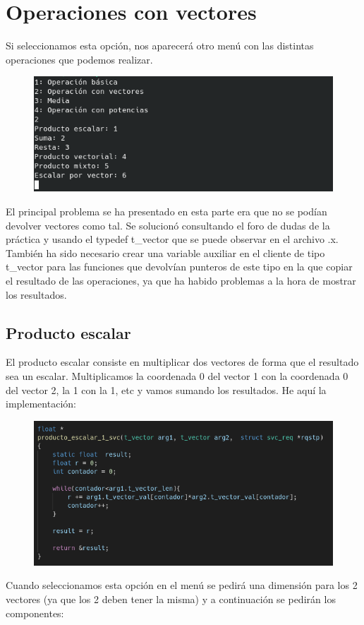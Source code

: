 \documentclass{article}
\begin{document}
	\section{Operaciones con vectores}
	Si seleccionamos esta opción, nos aparecerá otro menú con las distintas operaciones que podemos realizar.
	\begin{figure}[H]
		\centering
		\includegraphics[totalheight=4.5cm]{img/5.png}
	\end{figure}
	El principal problema se ha presentado en esta parte era que no se podían devolver vectores como tal. Se solucionó consultando el foro de dudas de la práctica y usando el typedef t\_vector que se puede observar en el archivo .x. También ha sido necesario crear una variable auxiliar en el cliente de tipo t\_vector para las funciones que devolvían punteros de este tipo en la que copiar el resultado de las operaciones, ya que ha habido problemas a la hora de mostrar los resultados.
	
	\subsection{Producto escalar}
	El producto escalar consiste en multiplicar dos vectores de forma que el resultado sea un escalar. Multiplicamos la coordenada 0 del vector 1 con la coordenada 0 del vector 2, la 1 con la 1, etc y vamos sumando los resultados. He aquí la implementación:
	
	\begin{figure}[H]
		\centering
		\includegraphics[totalheight=6cm]{img/6.png}
	\end{figure}
	Cuando seleccionamos esta opción en el menú se pedirá una dimensión para los 2 vectores (ya que los 2 deben tener la misma) y a continuación se pedirán los componentes:
	
\end{document}
